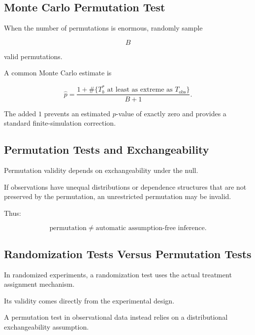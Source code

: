 \subsection{Monte Carlo Permutation Test}
\label{subsec:monte-carlo-permutation}

When the number of permutations is enormous, randomly sample

\[
B
\]

valid permutations.

A common Monte Carlo estimate is

\[
\boxed{
\widehat{p}
=
\frac{
1+
\#\{
T_b^*
\text{ at least as extreme as }T_{\text{obs}}
\}
}{
B+1
}.
}
\]

The added \(1\) prevents an estimated \(p\)-value of exactly zero and
provides a standard finite-simulation correction.

\subsection{Permutation Tests and Exchangeability}
\label{subsec:permutation-exchangeability}

Permutation validity depends on exchangeability under the null.

If observations have unequal distributions or dependence structures that
are not preserved by the permutation, an unrestricted permutation may be
invalid.

Thus:

\[
\boxed{
\text{permutation}
\neq
\text{automatic assumption-free inference}.
}
\]

\subsection{Randomization Tests Versus Permutation Tests}
\label{subsec:randomization-versus-permutation}

In randomized experiments, a randomization test uses the actual treatment
assignment mechanism.

Its validity comes directly from the experimental design.

A permutation test in observational data instead relies on a
distributional exchangeability assumption.

